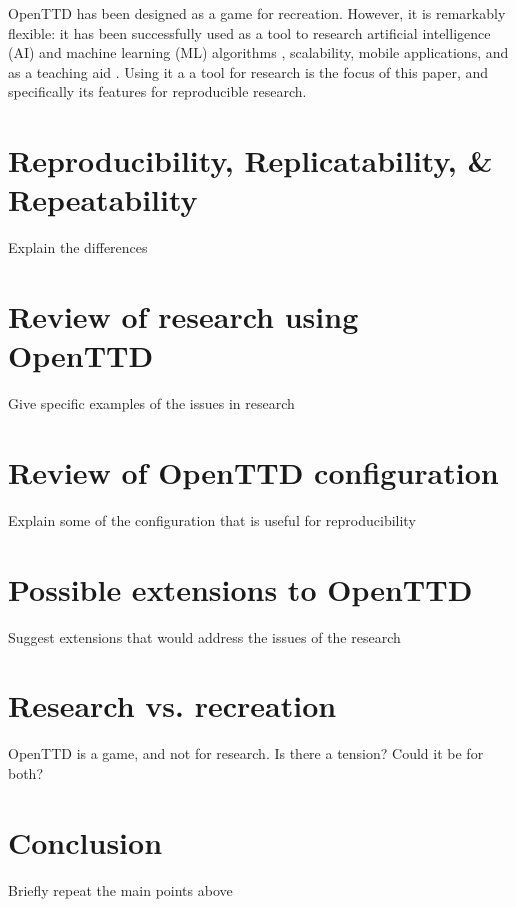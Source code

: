 \documentclass[twocolumn]{article}
\begin{document}
OpenTTD has been designed as a game for recreation. However, it is remarkably flexible: it has been successfully used as a tool to research artificial intelligence (AI) and machine learning (ML) algorithms \cite{wisniewski2011artificial, rios2009trains, bijlsma2014evolving}, scalability, mobile applications, and as a teaching aid \cite{HansenMuprhie2018}. Using it a a tool for research is the focus of this paper, and specifically its features for reproducible research.

\section{Reproducibility, Replicatability, \& Repeatability}
\begin{YStkyNote}
Explain the differences
\end{YStkyNote}

\section{Review of research using OpenTTD}

\begin{YStkyNote}
Give specific examples of the issues in research
\end{YStkyNote}

\section{Review of OpenTTD configuration}

\begin{YStkyNote}
Explain some of the configuration that is useful for reproducibility
\end{YStkyNote}

\section{Possible extensions to OpenTTD}

\begin{YStkyNote}
Suggest extensions that would address the issues of the research
\end{YStkyNote}

\section{Research vs. recreation}

\begin{YStkyNote}
OpenTTD is a game, and not for research. Is there a tension? Could it be for both?
\end{YStkyNote}

\section{Conclusion}

\begin{YStkyNote}
Briefly repeat the main points above
\end{YStkyNote}

\normalsize


\end{document}
